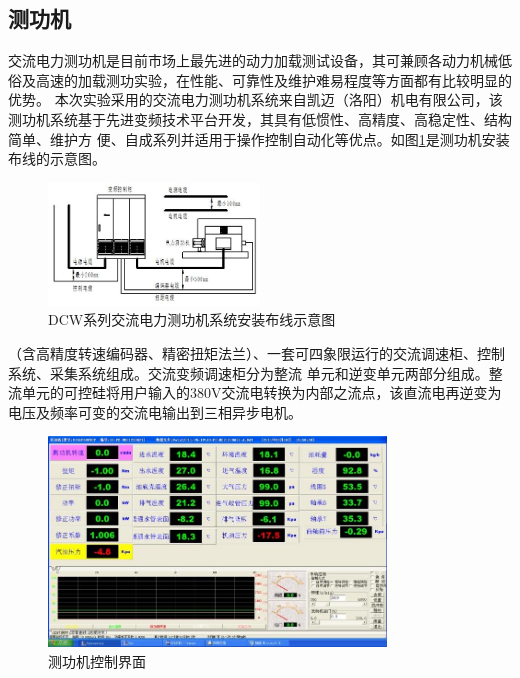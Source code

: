 \subsection{测功机}
交流电力测功机是目前市场上最先进的动力加载测试设备，其可兼顾各动力机械低俗及高速的加载测功实验，在性能、可靠性及维护难易程度等方面都有比较明显的优势。
本次实验采用的交流电力测功机系统来自凯迈（洛阳）机电有限公司，该测功机系统基于先进变频技术平台开发，其具有低惯性、高精度、高稳定性、结构简单、维护方
便、自成系列并适用于操作控制自动化等优点。如图\ref{fig:dlcgj}是测功机安装布线的示意图。
\begin{figure}[H]
	\centering
	\includegraphics[width=0.5\textwidth]{thesis_figure/platformer_chapter/dlcgj}
	\caption{DCW系列交流电力测功机系统安装布线示意图}
	\label{fig:dlcgj}
\end{figure}
（含高精度转速编码器、精密扭矩法兰）、一套可四象限运行的交流调速柜、控制系统、采集系统组成。交流变频调速柜分为整流
单元和逆变单元两部分组成。整流单元的可控硅将用户输入的380V交流电转换为内部之流点，该直流电再逆变为电压及频率可变的交流电输出到三相异步电机。
\begin{figure}[H]
	\centering
	\includegraphics[width=0.8\textwidth]{thesis_figure/platformer_chapter/cgjkzjm}
	\caption{测功机控制界面}
	\label{fig:cgjkzjm}
\end{figure}

